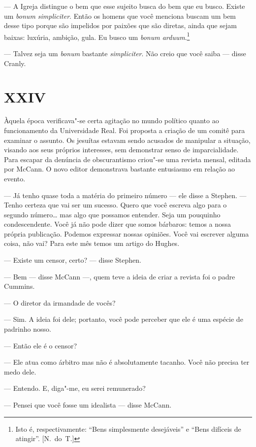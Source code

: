 --- A Igreja distingue o bem que esse sujeito busca do bem que eu busco.
Existe um \textit{bonum simpliciter}.  Então os homens que você menciona buscam
um bem desse tipo porque são impelidos por paixões que são diretas,
ainda que sejam baixas: luxúria, ambição, gula.  Eu busco um \textit{bonum
arduum}.\footnote[\setcounter{symbol}{2}]{ Isto é, respectivamente: “Bens simplesmente desejáveis” e
“Bens difíceis de atingir”. [N.~do~T.]}

--- Talvez seja um \textit{bonum} bastante \textit{simpliciter}.  Não creio que
você saiba --- disse Cranly.


\section*{XXIV}

Àquela época verificava"-se certa agitação no mundo político quanto ao
funcionamento da Universidade Real.  Foi proposta a criação de um comitê para
examinar o assunto.  Os jesuítas estavam sendo acusados de manipular a
situação, visando aos seus próprios interesses, sem demonstrar senso de
imparcialidade.  Para escapar da denúncia de obscurantismo criou"-se uma revista
mensal, editada por McCann.  O novo editor demonstrava bastante entusiasmo em
relação ao evento.

--- Já tenho quase toda a matéria do primeiro número --- ele disse a Stephen.
--- Tenho certeza que vai ser um sucesso.  Quero que você escreva algo para o
segundo número\ldots{} mas algo que possamos entender.  Seja um pouquinho
condescendente.  Você já não pode dizer que somos bárbaros: temos a nossa
própria publicação.  Podemos expressar nossas opiniões.  Você vai escrever
alguma coisa, não vai?  Para este mês temos um artigo do Hughes.

--- Existe um censor, certo? --- disse Stephen.

--- Bem --- disse McCann ---, quem teve a ideia de criar a revista foi o padre
Cummins.

--- O diretor da irmandade de vocês?

--- Sim.  A ideia foi dele; portanto, você pode perceber que ele é uma espécie
de padrinho nosso.

--- Então ele é o censor?

--- Ele atua como árbitro mas não é absolutamente tacanho.  Você não precisa
ter medo dele.

--- Entendo.  E, diga"-me, eu serei remunerado?

--- Pensei que você fosse um idealista --- disse McCann.

